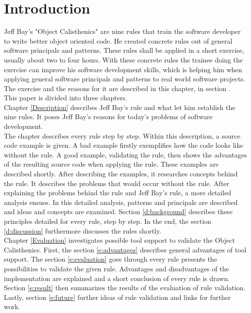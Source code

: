 \chapter{Introduction}
Jeff Bay's "Object Calisthenics" \cite{bay2008} are nine rules that train the software developer to write better object oriented code.  He created concrete rules out of general software principals and patterns. These rules shall be applied in a short exercise, usually about two to four hours. With these concrete rules the trainee doing the exercise can improve his software development skills, which is helping him when applying general software principals and patterns to real world software projects. The exercise and the reasons for it are described in this chapter, in section \cite{i:exercising}.\\

This paper is divided into three chapters.\\

Chapter \ref{Description} describes Jeff Bay's rule and what let him establish the nine rules. It poses Jeff Bay's reasons for today's problems of software development.\\

The chapter describes every rule step by step. Within this description, a source code example is given. A bad example firstly exemplifies how the code looks like without the rule. A good example, validating the rule, then shows the advantages of the resulting source code when applying the rule. These examples are described shortly. After describing the examples, it researches concepts behind the rule. It describes the problems that would occur without the rule. After explaining the problems behind the rule and Jeff Bay's rule, a more detailed analysis ensues. In this detailed analysis, patterns and principals are described and ideas and concepts are examined. Section \ref{d:background} describes these principles detailed for every rule, step by step. In the end, the section \ref{d:discussion} furthermore discusses the rules shortly.\\

Chapter \ref{Evaluation} investigates possible tool support to validate the Object Calisthenics. First, the section \ref{e:advantages} describes general advantages of tool support. The section \ref{e:evaluation} goes through every rule presents the possibilities to validate the given rule. Advantages and disadvantages of the implementation are explained and a short conclusion of every rule is drawn. Section \ref{e:result} then summarizes the results of the evaluation of rule validation. Lastly, section \ref{e:future} further ideas of rule validation and links for further work.\\

